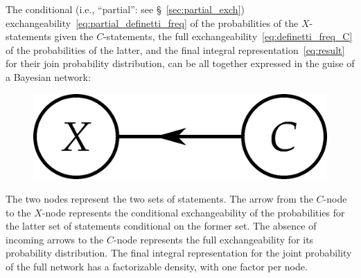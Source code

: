 \documentclass[\ifafour a4paper,12pt,\else a5paper,10pt,\fi%
onecolumn,oneside,article,%
british%
]{memoir}
\theoremstyle{remark}
\theoremstyle{innote}
\renewcommand*{\|}[1][]{\nonscript\,#1\vert\nonscript\,\mathopen{}}
\newcommand*{\sect}{\S}%
\newcommand*{\ie}{{i.e.}}
\renewcommand*{\=}{\TextOrMath\texteq\eq}
\begin{document}
The conditional (\ie, \enquote{partial}: see \sect~\ref{sec:partial_exch})
exchangeability~\eqref{eq:partial_definetti_freq} of the probabilities of
the $X$-statements given the $C$-statements, the full
exchangeability~\eqref{eq:definetti_freq_C} of the probabilities of the
latter, and the final integral representation~\eqref{eq:result} for their
join probability distribution, can be all together expressed in the guise
of a Bayesian network:\\
\begin{figure}[h!]
\centering\includegraphics[scale=0.5]{bayesnet1.png}
\caption{\label{fig:simplenet}}  
\end{figure}%
The two nodes represent the two sets of statements. The arrow from the
$C$-node to the $X$-node represents the conditional exchangeability of the
probabilities for the latter set of statements conditional on the former
set. The absence of incoming arrows to the $C$-node represents the full
exchangeability for its probability distribution. The final integral
representation for the joint probability of the full network has a
factorizable density, with one factor per node.
\end{document}
